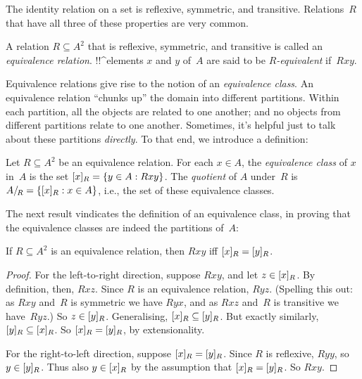 \documentclass[../../../include/open-logic-section]{subfiles}
\begin{document}


The identity relation on a set is reflexive, symmetric, and
transitive. Relations~$R$ that have all three of these properties are very
common.

\begin{defn} 
A relation $R \subseteq A^2$ that is reflexive, symmetric, and
transitive is called an \emph{equivalence relation}. !!^{element}s $x$
and $y$ of~$A$ are said to be \emph{$R$-equivalent} if~$Rxy$.
\end{defn}

Equivalence relations give rise to the notion of an \emph{equivalence
class}. An equivalence relation ``chunks up'' the domain into
different partitions. Within each partition, all the objects are
related to one another; and no objects from different partitions
relate to one another. Sometimes, it's helpful just to talk about
these partitions \emph{directly}. To that end, we introduce a
definition:

\begin{defn}
Let $R \subseteq A^2$ be an equivalence relation. For each $x \in A$,
the \emph{equivalence class} of $x$ in~$A$ is the set $[x]_{R}
= \{ y \in A : Rxy \}$. The \emph{quotient} of $A$ under~$R$ is
$A/_{\!{R}} = \{ [x]_{R} : x \in A \}$, i.e., the set
of these equivalence classes. 
\end{defn}

The next result vindicates the definition of an equivalence class, in
proving that the equivalence classes are indeed the partitions of~$A$:

\begin{prop}
If $R \subseteq A^2$ is an equivalence relation, then $Rxy$ iff
$[x]_{R} = [y]_{R}$.
\end{prop}

\begin{proof}
For the left-to-right direction, suppose $Rxy$, and let $z \in
[x]_{R}$. By definition, then, $Rxz$. Since $R$ is an
equivalence relation, $Ryz$. (Spelling this out: as $Rxy$ and~$R$ is
symmetric we have $Ryx$, and as $Rxz$ and~$R$ is transitive we
have~$Ryz$.) So $z \in [y]_{R}$. Generalising,
$[x]_{R} \subseteq [y]_{R}$. But exactly similarly,
$[y]_{R} \subseteq [x]_{R}$. So $[x]_{R} =
[y]_{R}$, by extensionality.

For the right-to-left direction, suppose $[x]_{R} =
[y]_{R}$. Since $R$ is reflexive, $Ryy$, so $y \in
[y]_{R}$. Thus also $y \in [x]_{R}$ by the assumption
that $[x]_{R} = [y]_{R}$. So $Rxy$.
\end{proof}
\end{document}
